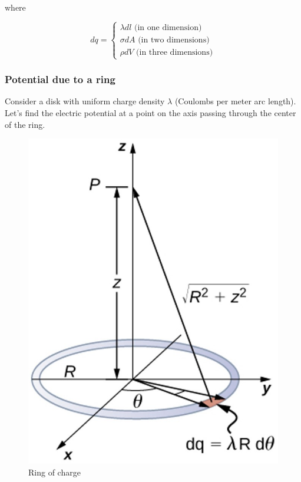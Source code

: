 \documentclass[14pt]{memoir}
\begin{document}
where

\begin{equation}
  dq = \begin{cases}
    \lambda dl \text{      (in one dimension)} \\
    \sigma dA \text{    (in two dimensions)} \\
    \rho dV \text{    (in three dimensions)} 
  \end{cases}
\end{equation}

\subsubsection{Potential due to a ring}

Consider a disk with uniform charge density $\lambda$ (Coulombs per meter arc length). Let's find the electric potential at a point on the axis passing through the center of the ring. 

\begin{figure}[H]
\begin{center}
\includegraphics[scale=0.40]{fig/fig_07_24.jpg}
\caption{Ring of charge}
\label{fig:07_24}
\end{center}
\end{figure}
\end{document}
